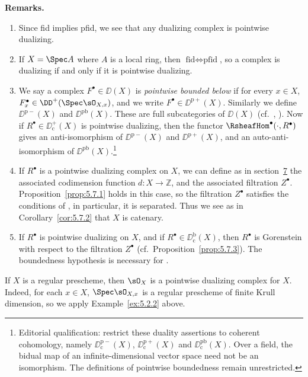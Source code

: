 \par\medskip\noindent\textbf{Remarks.}
\begin{enumerate}
\item Since fid implies pfid, we see that any dualizing complex is pointwise dualizing.
\item If $X=\Spec A$ where $A$ is a local ring, then $\text{fid}\iff\text{pfid}$, so a complex is dualizing if and only if it is pointwise dualizing.
\item We say a complex $F^\bullet\in\DD(X)$ is \emph{pointwise bounded below} if for every $x\in X$, $F_x^\bullet\in\DD^+(\Spec\sO_{X,x})$, and we write $F^\bullet\in\DD^{\mathrm{p}+}(X)$. Similarly we define $\DD^{\mathrm{p}-}(X)$ and $\DD^{\mathrm{pb}}(X)$. These are full subcategories of $\DD(X)$ (cf.\ , ). Now if $R^\bullet\in\DD_{\mathrm{c}}^+(X)$ is pointwise dualizing, then the functor $\RsheafHom^\bullet(\cdot,R^\bullet)$ gives an anti-isomorphism of $\DD^{\mathrm{p}-}(X)$ and $\DD^{\mathrm{p}+}(X)$, and an auto-anti-isomorphism of $\DD^{\mathrm{pb}}(X)$.\footnote{Editorial qualification: restrict these duality assertions to coherent cohomology, namely $\DD_{\mathrm c}^{\mathrm p-}(X)$, $\DD_{\mathrm c}^{\mathrm p+}(X)$ and $\DD_{\mathrm c}^{\mathrm{pb}}(X)$. Over a field, the bidual map of an infinite-dimensional vector space need not be an isomorphism. The definitions of pointwise boundedness remain unrestricted.}
\item If $R^\bullet$ is a pointwise dualizing complex on $X$, we can define as in section~\hyperref[sec:5.7]{7} the associated codimension function $d\colon X\to\mathbb{Z}$, and the associated filtration $Z^\bullet$. Proposition~\ref{prop:5.7.1} holds in this case, so the filtration $Z^\bullet$ satisfies the conditions of , in particular, it is separated. Thus we see as in Corollary~\ref{cor:5.7.2} that $X$ is catenary.
\item If $R^\bullet$ is pointwise dualizing on $X$, and if $R^\bullet\in\DD_{\mathrm{c}}^{\mathrm{b}}(X)$, then $R^\bullet$ is Gorenstein with respect to the filtration $Z^\bullet$ (cf.\ Proposition~\ref{prop:5.7.3}). The boundedness hypothesis is necessary for .
\end{enumerate}
\par\medskip

\begin{example*}
If $X$ is a regular prescheme, then $\sO_X$ is a pointwise dualizing complex for $X$. Indeed, for each $x\in X$, $\Spec\sO_{X,x}$ is a regular prescheme of finite Krull dimension, so we apply Example~\ref{ex:5.2.2} above.
\end{example*}

